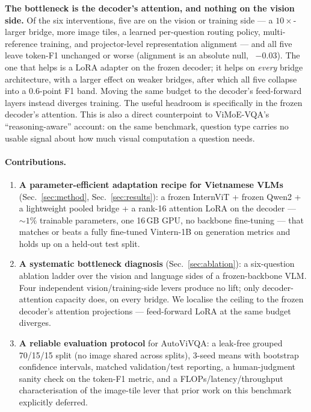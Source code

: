 \textbf{The bottleneck is the decoder's attention, and nothing on the vision
side.} Of the six interventions, five are on the vision or training side --- a
$10\times$-larger bridge, more image tiles, a learned per-question routing policy,
multi-reference training, and projector-level representation alignment --- and all
five leave token-F1 unchanged or worse (alignment is an absolute null,
\dF{}~$-0.03$). The one that helps is a LoRA adapter on the frozen decoder; it
helps on \emph{every} bridge architecture, with a larger effect on weaker
bridges, after which all five collapse into a $0.6$-point F1 band. Moving the same
budget to the decoder's feed-forward layers instead diverges training. The useful
headroom is specifically in the frozen decoder's attention. This is also a direct
counterpoint to ViMoE-VQA's ``reasoning-aware'' account: on the same benchmark,
question type carries no usable signal about how much visual computation a
question needs.

\paragraph{Contributions.}
\begin{enumerate}
\item \textbf{A parameter-efficient adaptation recipe for Vietnamese VLMs}
  (Sec.~\ref{sec:method}, Sec.~\ref{sec:results}): a frozen InternViT + frozen
  Qwen2 + a lightweight pooled bridge + a rank-16 attention LoRA on the decoder
  --- ${\sim}1\%$ trainable parameters, one 16\,GB GPU, no backbone fine-tuning
  --- that matches or beats a fully fine-tuned Vintern-1B on generation metrics
  and holds up on a held-out test split.
\item \textbf{A systematic bottleneck diagnosis} (Sec.~\ref{sec:ablation}): a
  six-question ablation ladder over the vision and language sides of a
  frozen-backbone VLM. Four independent vision/training-side levers produce no
  lift; only decoder-attention capacity does, on every bridge. We localise the
  ceiling to the frozen decoder's attention projections --- feed-forward LoRA at
  the same budget diverges.
\item \textbf{A reliable evaluation protocol} for AutoViVQA: a leak-free grouped
  70/15/15 split (no image shared across splits), 3-seed means with bootstrap
  confidence intervals, matched validation/test reporting, a human-judgment
  sanity check on the token-F1 metric, and a FLOPs/latency/throughput
  characterisation of the image-tile lever that prior work on this benchmark
  explicitly deferred.
\end{enumerate}
